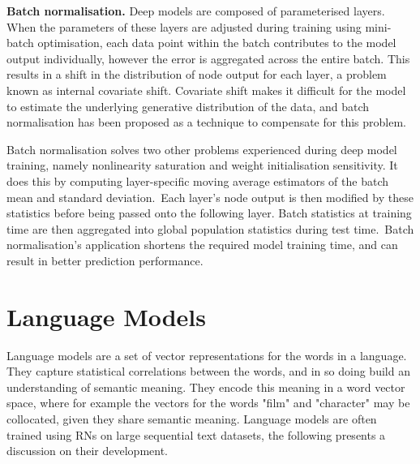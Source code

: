 \noindent \textbf{Batch normalisation.} Deep models are composed of parameterised layers. When the parameters of these layers are adjusted during training using mini-batch optimisation, each data point within the batch contributes to the model output individually, however the error is aggregated across the entire batch. This results in a shift in the distribution of node output for each layer, a problem known as internal covariate shift. Covariate shift makes it difficult for the model to estimate the underlying generative distribution of the data, and batch normalisation has been proposed as a technique to compensate for this problem. \par

\noindent Batch normalisation solves two other problems experienced during deep model training, namely nonlinearity saturation and weight initialisation sensitivity. It does this by computing layer-specific moving average estimators of the batch mean and standard deviation.\ Each layer's node output is then modified by these statistics before being passed onto the following layer. Batch statistics at training time are then aggregated into global population statistics during test time.\ Batch normalisation's application shortens the required model training time, and can result in better prediction performance. 



\section{Language Models}

\noindent Language models are a set of vector representations for the words in a language. They capture statistical correlations between the words, and in so doing build an understanding of semantic meaning. They encode this meaning in a word vector space, where for example the vectors for the words "film" and "character" may be collocated, given they share semantic meaning. Language models are often trained using RNs on large sequential text datasets, the following presents a discussion on their development. \par

